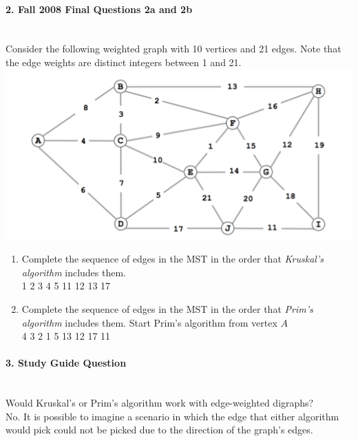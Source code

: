 \documentclass{article}
\begin{document}
\paragraph{\Large 2. Fall 2008 Final Questions 2a and 2b}\mbox{}\\
Consider the following weighted graph with 10 vertices and 21 edges. Note that the edge weights are distinct integers between 1 and 21.\\
\includegraphics[]{fin-f08-2.png}\\
\begin{enumerate}
\renewcommand{\theenumi}{\Alph{enumi}}
	\item Complete the sequence of edges in the MST in the order that \textit{Kruskal's algorithm} includes them.\\

	1 2 3 4 5 11 12 13 17

	\item Complete the sequence of edges in the MST in the order that \textit{Prim's algorithm} includes them. Start Prim's algorithm from vertex $A$\\

	4 3 2 1 5 13 12 17 11
\end{enumerate}

\paragraph{\Large 3. Study Guide Question}\mbox{}\\
Would Kruskal's or Prim's algorithm work with edge-weighted digraphs?\\

No. It is possible to imagine a scenario in which the edge that either algorithm would pick could not be picked due to the direction of the graph's edges.
\end{document}
